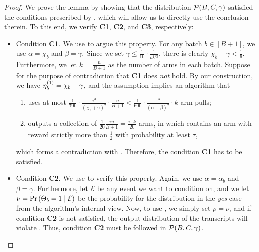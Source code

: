 \begin{proof}
	We prove the lemma by showing that the distribution $\mathcal{P}(B, C, \gamma)$ satisfied the conditions prescribed by , which will allow us to directly use the conclusion therein. To this end, we verify \textbf{C1}, \textbf{C2}, and \textbf{C3}, respectively:
	\begin{itemize}
		\item Condition \textbf{C1}. We use  to argue this property. For any batch $b\in [B+1]$, we use $\alpha=\chi_{b}$ and $\beta=\gamma$. Since we set $\gamma\leq \frac{1}{10}\cdot \frac{1}{n^{1/3}}$, there is clearly $\chi_{b}+\gamma<\frac{1}{6}$. Furthermore, we let $k=\frac{n}{B+1}$ as the number of arms in each batch. Suppose for the purpose of contradiction that \textbf{C1} does \emph{not} hold. By our construction, we have $\eta^{(1)}_{b}=\chi_{b}+\gamma$, and the assumption implies an algorithm that
		\begin{enumerate}
			\item uses at most $\frac{1}{700}\cdot \frac{\tau^3}{(\chi_{b}+\gamma)^2}\cdot \frac{n}{B+1}<\frac{1}{600}\cdot\frac{\tau^3}{(\alpha+\beta)^2}\cdot k$ arm pulls;
			\item outputs a collection of $\frac{1}{20}\frac{\tau n}{B+1}=\frac{\tau \cdot k}{20}$ arms, in which contains an arm with reward strictly more than $\frac{1}{2}$ with probability at least $\tau$,
		\end{enumerate}
		which forms a contradiction with . Therefore, the condition \textbf{C1} has to be satisfied.
		
		\item Condition \textbf{C2}. We use  to verify this property. Again, we use $\alpha=\alpha_{b}$ and $\beta=\gamma$. Furthermore, let $\mathcal{E}$ be any event we want to condition on, and we let $\nu=\operatorname*{\textnormal{Pr}}\left(\Theta_{b}=1\mid \mathcal{E}\right)$ be the probability for the distribution in the \emph{yes} case from the algorithm's internal view. Now, to use , we simply set $\rho=\nu$, and if condition \textbf{C2} is not satisfied, the output distribution of the transcripts will violate . Thus, condition \textbf{C2} must be followed in $\mathcal{P}(B, C, \gamma)$.
		

\end{itemize}
\end{proof}
